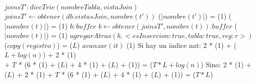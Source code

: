 {                \var $joinsT' : diccTrie(nombreTabla, vistaJoin)$
                \State $joinsT' \gets obtener(db.vistasJoin, nombre(t'))$               \comment \bigo($|nombre(t')|$) = \bigo(1)
                                \comment \bigo($|nombre(t)|$) = \bigo(1)
                    \var $b : buffer$
                    \State $b \gets obtener(joinsT', nombre(t)).buffer$                 \comment \bigo($|nombre(t)|$) = \bigo(1)
                    \State $agregarAtras(b, <esInsercion: true, tabla: true, reg: r>)$  \comment \bigo($copy(registro)$) = \bigo($L$)
                \EndIf
            \EndIf
        \EndIf
        \State $avanzar(it)$                                        \comment \bigo(1)
    \EndWhile
}{Si hay un índice nat: 2 * \bigo(1) + \bigo($L + log(n)$) + 2 * \bigo(1) \\
    \hspace*{16em} + $T$ * (6 * \bigo(1) + \bigo($L$) + 4 * \bigo(1) + \bigo($L$) + \bigo(1)) = \bigo($T * L + log(n)$)
    \hspace*{8.25em} Sino: 2 * \bigo(1) + \bigo($L$) + 2 * \bigo(1)
    + $T$ * (6 * \bigo(1) + \bigo($L$) + 4 * \bigo(1) + \bigo($L$) + \bigo(1)) = \bigo($T * L$)
}

